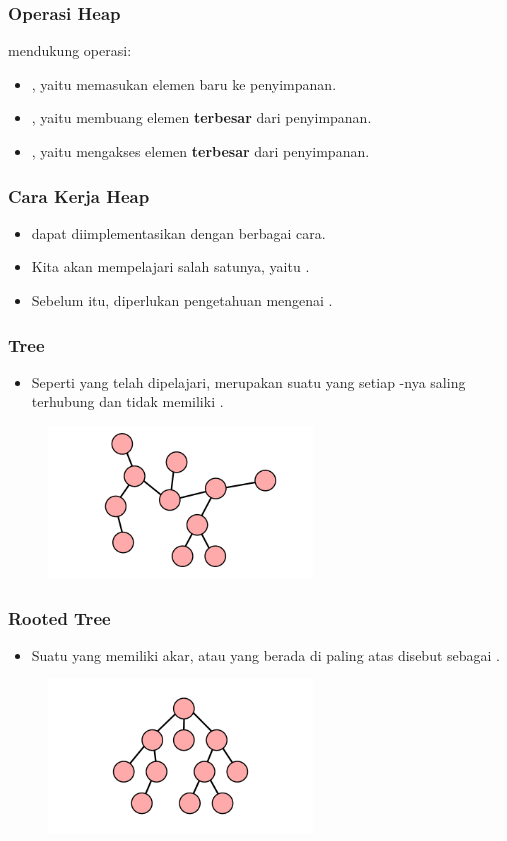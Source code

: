 \begin{frame}
\frametitle{Operasi Heap}
\pHeap mendukung operasi:
\begin{itemize}
  \item {}, yaitu memasukan elemen baru ke penyimpanan.
  \item {}, yaitu membuang elemen \textbf{terbesar} dari penyimpanan.
  \item {}, yaitu mengakses elemen \textbf{terbesar} dari penyimpanan. 
\end{itemize}
\end{frame}

\begin{frame}
\frametitle{Cara Kerja Heap}
\begin{itemize}
  \item \pHeap dapat diimplementasikan dengan berbagai cara.
  \item Kita akan mempelajari salah satunya, yaitu \pBinaryHeap.
  \item Sebelum itu, diperlukan pengetahuan mengenai .
\end{itemize}
\end{frame}

\begin{frame}
\frametitle{Tree}
\begin{itemize}
  \item Seperti yang telah dipelajari, \ftree merupakan suatu \fgraph yang setiap \fnode-nya saling terhubung dan tidak memiliki .
\end{itemize}
\begin{figure}
  \includegraphics[width=7cm]{asset/tree.pdf}
\end{figure}
\end{frame}

\begin{frame}
\frametitle{Rooted Tree}
\begin{itemize}
  \item Suatu \ftree yang memiliki akar, atau \fnode yang berada di paling atas disebut sebagai .
\end{itemize}
\begin{figure}
  \includegraphics[width=7cm]{asset/rooted-tree.pdf}
\end{figure}
\end{frame}

